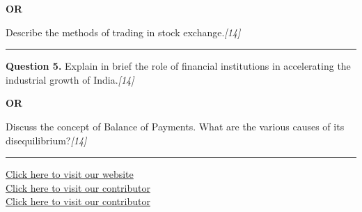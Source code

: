 \documentclass[11pt,a4paper]{article}
\newcommand{\pts}[1]{\hfill   \textit{[#1]}}
\begin{document}
\centerline{   \textbf{OR}}

Describe the methods of trading in stock exchange.\pts{14}

\medskip\rule{\linewidth}{0.2pt}




\noindent   \textbf{Question 5.}
Explain in brief the role of financial institutions in accelerating the industrial growth of India.\pts{14}

\centerline{   \textbf{OR}}

Discuss the concept of Balance of Payments. What are the various causes of its disequilibrium?\pts{14}

\vfill
\rule{\linewidth}{0.4pt}

\begin{center}\small
\href{https://bhu-exam.vercel.app/}{Click here to visit our website}\\[4pt]
\href{https://me-aryan.vercel.app/}{Click here to visit our contributor}\\[4pt]
\href{https://quashan-me.vercel.app/}{Click here to visit our contributor}
\end{center}
\end{document}
